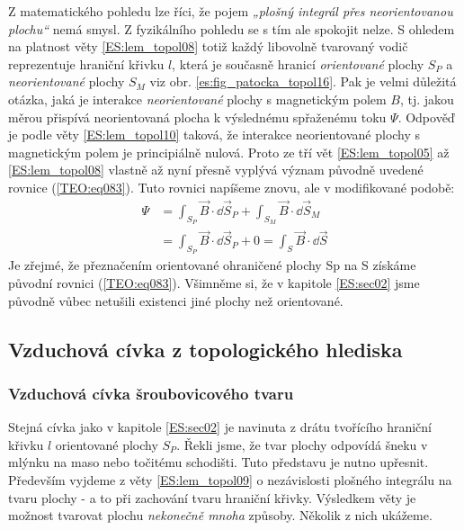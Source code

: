       Z matematického pohledu lze říci, že pojem \emph{„plošný integrál přes neorientovanou 
      plochu“} nemá smysl. Z fyzikálního pohledu se s tím ale spokojit nelze. S ohledem na platnost 
      věty \ref{ES:lem_topol08} totiž každý libovolně tvarovaný vodič reprezentuje hraniční křivku 
      \(l\), která je současně hranicí \emph{orientované} plochy \(S_P\) a \emph{neorientované} 
      plochy \(S_M\) viz obr. \ref{es:fig_patocka_topol16}. Pak je velmi důležitá otázka, jaká je 
      interakce \emph{neorientované} plochy s magnetickým polem \(B\), tj. jakou měrou přispívá 
      neorientovaná plocha k výslednému spřaženému toku \(\Psi\). Odpověď je podle věty 
      \ref{ES:lem_topol10} taková, že interakce neorientované plochy s magnetickým polem je 
      principiálně nulová. Proto ze tří vět \ref{ES:lem_topol05} až \ref{ES:lem_topol08} vlastně až 
      nyní přesně vyplývá význam původně uvedené rovnice (\ref{TEO:eq083}). Tuto rovnici 
      napíšeme znovu, ale v modifikované podobě:
      \begin{align}\label{ES:eq_topol18}
        \Psi &= \int_{S_P}\vec{B}\cdot \dd{\vec{S}}_P + \int_{S_M}\vec{B}\cdot \dd{\vec{S}}_M \nonumber \\
             &= \int_{S_P}\vec{B}\cdot \dd{\vec{S}}_P + 0 
              = \int_{S}\vec{B}\cdot \dd{\vec{S}}
      \end{align}
      Je zřejmé, že přeznačením orientované ohraničené plochy Sp na S získáme původní rovnici 
      (\ref{TEO:eq083}). Všimněme si, že v kapitole \ref{ES:sec02} jsme původně vůbec 
      netušili existenci jiné plochy než orientované.
    
    \subsection{Vzduchová cívka z topologického hlediska}\label{teo:IchapIIsecIIsubV}
      \subsubsection{Vzduchová cívka šroubovicového tvaru}        
        Stejná cívka jako v kapitole \ref{ES:sec02} je navinuta z drátu tvořícího hraniční křivku 
        \(l\) orientované plochy \(S_P\). Řekli jsme, že tvar plochy odpovídá šneku v mlýnku na 
        maso nebo točitému schodišti. Tuto představu je nutno upřesnit. Především vyjdeme z věty 
        \ref{ES:lem_topol09} o nezávislosti plošného integrálu na tvaru plochy - a to při zachování 
        tvaru hraniční křivky. Výsledkem věty je možnost tvarovat plochu \emph{nekonečně mnoha} 
        způsoby. Několik z nich ukážeme.

